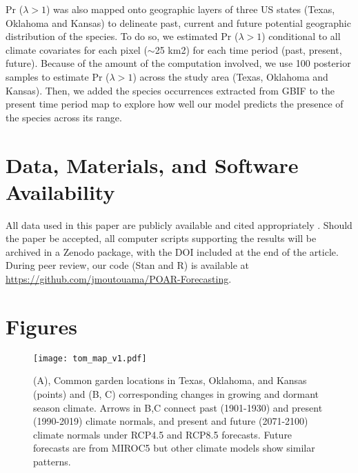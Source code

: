 \documentclass[9pt,twocolumn,twoside,lineno]{pnas-new}
\newcommand{\tom}[2]{{\color{red}{#1}}\footnote{\textit{\color{red}{#2}}}}
\begin{document}
Pr ($\lambda > 1$) was also mapped onto geographic layers of three US states (Texas, Oklahoma and Kansas) to delineate past, current and future potential geographic distribution of the species.
To do so, we estimated Pr ($\lambda > 1$) conditional to all climate covariates for each pixel ($\sim$25 km2) for each time period (past, present, future).
Because of the amount of the computation involved, we use 100 posterior samples to estimate Pr ($\lambda > 1$) across the study area (Texas, Oklahoma and Kansas).
Then, we added the species occurrences extracted from GBIF to the present time period map to explore how well our model predicts the presence of the species across its range.


\showmatmethods{} %

\section*{Data, Materials, and Software Availability}
All data used in this paper are  publicly available and cited appropriately \citep{dryaddata}. 
Should the paper be accepted, all computer scripts supporting the results will be archived in a Zenodo package, with the DOI included at the end of the article. 
During peer review, our code (Stan and R) is available at \url{https://github.com/jmoutouama/POAR-Forecasting}. 


\showacknow{} %



\clearpage
\onecolumn
\section*{Figures}
\begin{figure}[H]
\centering
\texttt{[image: tom\_map\_v1.pdf]}
\caption{(A), Common garden locations in Texas, Oklahoma, and Kansas (points) and (B, C) corresponding changes in growing and dormant season climate. Arrows in B,C connect past (1901-1930) and present (1990-2019) climate normals, and present and future (2071-2100) climate normals under RCP4.5 and RCP8.5 forecasts. Future forecasts are from MIROC5 but other climate models show similar patterns.
			}
\label{fig:study_design}
\end{figure}
\clearpage
\end{document}
